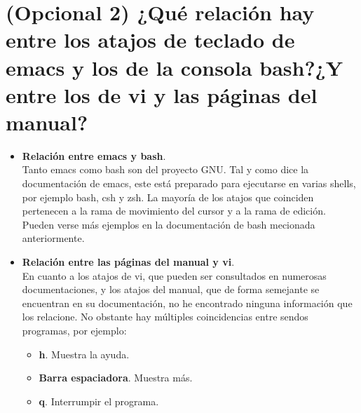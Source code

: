 

\section{(Opcional 2) ¿Qué relación hay entre los atajos de teclado de emacs y los de la consola bash?¿Y entre los de vi y las páginas del manual?} 


\begin{itemize}
\item \textbf{Relación entre emacs y bash}. \\ 
Tanto emacs\cite{emacs} como bash \cite{bash} son del proyecto GNU. Tal y como dice la documentación de emacs, este está preparado para ejecutarse en varias shells, por
ejemplo bash, csh y zsh. La mayoría de los atajos que coinciden pertenecen a la rama de movimiento del cursor y a la rama de edición. Pueden verse más ejemplos en la 
documentación de bash mecionada anteriormente. 
\item \textbf{Relación entre las páginas del manual y vi}.\\
 En cuanto a los atajos de vi, que pueden ser consultados en numerosas documentaciones\cite{vi}, y los atajos del manual, que de forma semejante se encuentran en su 
documentación\cite{manman}, no he encontrado ninguna información que los relacione. No obstante hay múltiples coincidencias entre sendos programas, por ejemplo:
	\begin{itemize}
		\item \textbf{h}. Muestra la ayuda.
		\item \textbf{Barra espaciadora}. Muestra más.
		\item \textbf{q}. Interrumpir el programa.
	\end{itemize}
\end{itemize}


\newpage




